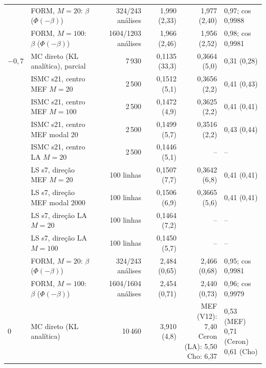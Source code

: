 \begin{table}[H]
\begin{tabular}{llrrrl}
 & FORM, $M = 20$: $\beta$ ($\Phi(-\beta)$) & 324/243 análises & 1,990 (2,33) & 1,977 (2,40) & 0,97; cos 0,9988 \\
 & FORM, $M = 100$: $\beta$ ($\Phi(-\beta)$) & 1604/1203 análises & 1,966 (2,46) & 1,956 (2,52) & 0,98; cos 0,9981 \\
\midrule
$-0{,}7$ & MC direto (KL analítica), parcial & 7\,930 & 0,1135 (33,3) & 0,3664 (5,0) & 0,31 (0,28) \\
 & ISMC s21, centro MEF $M = 20$ & 2\,500 & 0,1512 (5,1) & 0,3656 (2,2) & 0,41 (0,43) \\
 & ISMC s21, centro MEF $M = 100$ & 2\,500 & 0,1472 (4,9) & 0,3625 (2,2) & 0,41 (0,41) \\
 & ISMC s21, centro MEF modal 20 & 2\,500 & 0,1499 (5,7) & 0,3516 (2,2) & 0,43 (0,44) \\
 & ISMC s21, centro LA $M = 20$ & 2\,500 & 0,1446 (5,1) & -- & -- \\
 & LS s7, direção MEF $M = 20$ & 100 linhas & 0,1507 (7,7) & 0,3642 (6,8) & 0,41 (0,41) \\
 & LS s7, direção MEF modal 2000 & 100 linhas & 0,1506 (6,9) & 0,3665 (5,6) & 0,41 (0,41) \\
 & LS s7, direção LA $M = 20$ & 100 linhas & 0,1464 (7,2) & -- & -- \\
 & LS s7, direção LA $M = 100$ & 100 linhas & 0,1450 (5,7) & -- & -- \\
 & FORM, $M = 20$: $\beta$ ($\Phi(-\beta)$) & 324/243 análises & 2,484 (0,65) & 2,466 (0,68) & 0,95; cos 0,9981 \\
 & FORM, $M = 100$: $\beta$ ($\Phi(-\beta)$) & 1604/1604 análises & 2,454 (0,71) & 2,440 (0,73) & 0,96; cos 0,9979 \\
\midrule
$0$ & MC direto (KL analítica) & 10\,460 & 3,910 (4,8) & \makecell[r]{MEF (V12): 7,40\\Ceron (LA): 5,50\\Cho: 6,37} & \makecell[l]{0,53 (MEF)\\0,71 (Ceron)\\0,61 (Cho)} \\
\bottomrule\end{tabular}\end{table}
